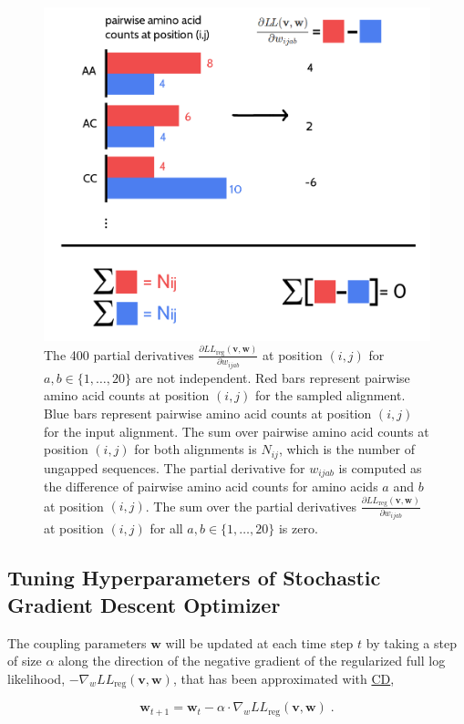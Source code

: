 \documentclass[11pt,a4paper,twoside]{book}
\newcommand{\LLreg}{L\!L_\mathrm{reg}}
\renewcommand{\v}{\mathbf{v}}
\newcommand{\w}{\mathbf{w}}
\newcommand{\wijab}{w_{ijab}}
\theoremstyle{definition}
\theoremstyle{definition}
\theoremstyle{remark}
\begin{document}
\begin{figure}

{\centering \includegraphics[width=0.6\linewidth]{img/full_likelihood/constraint_wijab} 

}

\caption{The 400 partial derivatives
\(\frac{\partial \LLreg(\v,\w)}{\partial \wijab}\) at position \((i,j)\)
for \(a,b \in \{1, \ldots, 20 \}\) are not independent. Red bars
represent pairwise amino acid counts at position \((i,j)\) for the
sampled alignment. Blue bars represent pairwise amino acid counts at
position \((i,j)\) for the input alignment. The sum over pairwise amino
acid counts at position \((i,j)\) for both alignments is \(N_{ij}\),
which is the number of ungapped sequences. The partial derivative for
\(\wijab\) is computed as the difference of pairwise amino acid counts
for amino acids \(a\) and \(b\) at position \((i,j)\). The sum over the
partial derivatives \(\frac{\partial \LLreg(\v,\w)}{\partial \wijab}\)
at position \((i,j)\) for all \(a,b \in \{1, \ldots, 20 \}\) is zero.}\label{fig:visualisation-wijab-constraint}
\end{figure}

\subsection{Tuning Hyperparameters of Stochastic Gradient Descent
Optimizer}\label{sgd-hyperparameter-tuning}

The coupling parameters \(\w\) will be updated at each time step \(t\)
by taking a step of size \(\alpha\) along the direction of the negative
gradient of the regularized full log likelihood,
\(- \nabla_w \LLreg(\v,\w)\), that has been approximated with
\protect\hyperlink{abbrev}{CD},

\begin{equation}
  \w_{t+1} = \w_t - \alpha \cdot \nabla_w \LLreg(\v,\w) \; .
\end{equation}
\end{document}
